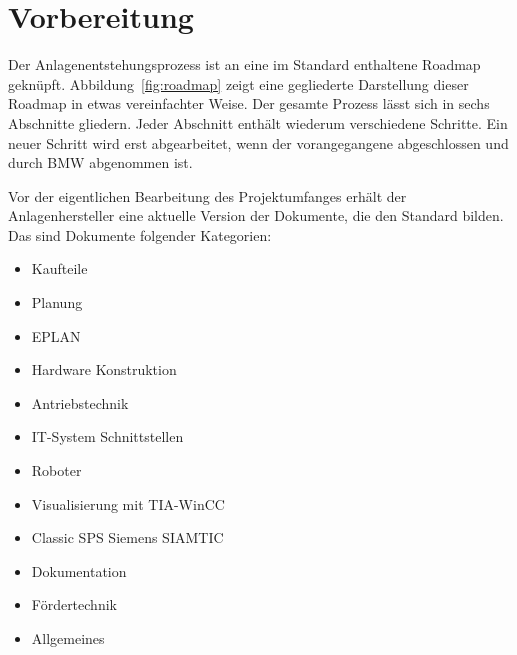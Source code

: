 


\section{Vorbereitung}
\label{sec:preparation}

Der Anlagenentstehungsprozess ist an eine im Standard enthaltene Roadmap geknüpft. Abbildung~\ref{fig:roadmap} zeigt eine gegliederte Darstellung dieser Roadmap in etwas vereinfachter Weise. %
Der gesamte Prozess lässt sich in sechs Abschnitte gliedern. Jeder Abschnitt enthält wiederum verschiedene Schritte. Ein neuer Schritt wird erst abgearbeitet, wenn der vorangegangene abgeschlossen und durch BMW abgenommen ist.

Vor der eigentlichen Bearbeitung des Projektumfanges erhält der Anlagenhersteller eine aktuelle Version der Dokumente, die den Standard bilden. Das sind Dokumente folgender Kategorien:
  \begin{itemize}
    \itemsep0.05em
    \item Kaufteile
    \item Planung
    \item EPLAN
    \item Hardware Konstruktion
    \item Antriebstechnik
    \item IT-System Schnittstellen
    \item Roboter
    \item Visualisierung mit TIA-WinCC
    \item Classic SPS Siemens SIAMTIC
    \item Dokumentation
    \item Fördertechnik
    \item Allgemeines
  \end{itemize}\leer

